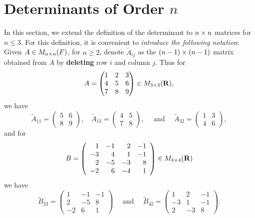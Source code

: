 \section{Determinants of Order \(n\)} \label{sec 4.2}

In this section, we extend the definition of the determinant to \(n \times n\) matrices for \(n \le 3\).
For this definition, it is convenient to \emph{introduce the following notation}:
Given \(A \in M_{n \times n}(F)\), for \(n \ge 2\), denote \(\tilde{A}_{ij}\) as the \((n - 1) \times (n - 1)\) matrix obtained from \(A\) by \textbf{deleting} row \(i\) and column \(j\).
Thus for
\[
    A = \begin{pmatrix} 1 & 2 & 3 \\ 4 & 5 & 6 \\ 7 & 8 & 9 \end{pmatrix} \in M_{3 \times 3}(\mathbf{R}),
\]
we have
\[
    \tilde{A}_{11} = \left(\begin{array}{cc}
        5 & 6 \\
        8 & 9
    \end{array}\right), \quad \tilde{A}_{13} = \left(\begin{array}{ll}
        4 & 5 \\
        7 & 8
    \end{array}\right),
    \quad \text { and } \quad \tilde{A}_{32} = \left(\begin{array}{ll}
        1 & 3 \\
        4 & 6
    \end{array}\right),
\]
and for
\[
    B = \left(\begin{array}{rrrr}
        1 & -1 & 2 & -1 \\
        -3 & 4 & 1 & -1 \\
        2 & -5 & -3 & 8 \\
        -2 & 6 & -4 & 1
    \end{array}\right) \in M_{4 \times 4}(\mathbf{R})
\]
we have
\[
    \tilde{B}_{23} = \left(\begin{array}{rrr}
        1 & -1 & -1 \\
        2 & -5 & 8 \\
        -2 & 6 & 1
    \end{array}\right)
    \quad \text { and } \quad
    \tilde{B}_{42} = \left(\begin{array}{rrr}
        1 & 2 & -1 \\
        -3 & 1 & -1 \\
        2 & -3 & 8
    \end{array}\right).
\]

